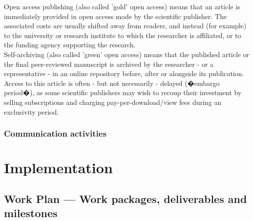 \documentclass[a4paper,11pt]{article}
\begin{document}
{Open access publishing (also called 'gold' open access) means that an article is
immediately provided in open access mode by the scientific publisher. The associated costs
are usually shifted away from readers, and instead (for example) to the university or
research institute to which the researcher is affiliated, or to the funding agency supporting
the research.\\
Self-archiving (also called 'green' open access) means that the published article or the
final peer-reviewed manuscript is archived by the researcher - or a representative - in an
online repository before, after or alongside its publication. Access to this article is often -
but not necessarily - delayed (�embargo period�), as some scientific publishers may wish to
recoup their investment by selling subscriptions and charging pay-per-download/view fees
during an exclusivity period.}

\draftpage

\subsubsection{Communication activities}
\label{subsubsect:communication}


\clearpage




\section{Implementation}

\subsection{Work Plan --- Work packages, deliverables and milestones}
\label{sect:workplan}
\end{document}
